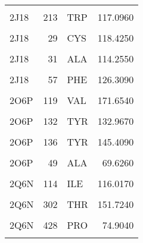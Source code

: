 \begin{table}
\begin{tabular}{lrlr}
			\cellcolor{gray!6}{2J18} & \cellcolor{gray!6}{186} & \cellcolor{gray!6}{PHE} & \cellcolor{gray!6}{174.2510}\\
			2J18 & 213 & TRP & 117.0960\\
			\cellcolor{gray!6}{2J18} & \cellcolor{gray!6}{28} & \cellcolor{gray!6}{PRO} & \cellcolor{gray!6}{75.1381}\\
			2J18 & 29 & CYS & 118.4250\\
			\addlinespace
			\cellcolor{gray!6}{2J18} & \cellcolor{gray!6}{30} & \cellcolor{gray!6}{PRO} & \cellcolor{gray!6}{66.0535}\\
			2J18 & 31 & ALA & 114.2550\\
			\cellcolor{gray!6}{2J18} & \cellcolor{gray!6}{32} & \cellcolor{gray!6}{LEU} & \cellcolor{gray!6}{96.2823}\\
			2J18 & 57 & PHE & 126.3090\\
			\cellcolor{gray!6}{2J18} & \cellcolor{gray!6}{71} & \cellcolor{gray!6}{ALA} & \cellcolor{gray!6}{139.0360}\\
			\addlinespace
			2O6P & 119 & VAL & 171.6540\\
			\cellcolor{gray!6}{2O6P} & \cellcolor{gray!6}{121} & \cellcolor{gray!6}{ILE} & \cellcolor{gray!6}{132.2050}\\
			2O6P & 132 & TYR & 132.9670\\
			\cellcolor{gray!6}{2O6P} & \cellcolor{gray!6}{134} & \cellcolor{gray!6}{HIS} & \cellcolor{gray!6}{146.7790}\\
			2O6P & 136 & TYR & 145.4090\\
			\addlinespace
			\cellcolor{gray!6}{2O6P} & \cellcolor{gray!6}{48} & \cellcolor{gray!6}{ILE} & \cellcolor{gray!6}{141.3220}\\
			2O6P & 49 & ALA & 69.6260\\
			\cellcolor{gray!6}{2O6P} & \cellcolor{gray!6}{52} & \cellcolor{gray!6}{TYR} & \cellcolor{gray!6}{136.9010}\\
			2Q6N & 114 & ILE & 116.0170\\
			\cellcolor{gray!6}{2Q6N} & \cellcolor{gray!6}{298} & \cellcolor{gray!6}{ALA} & \cellcolor{gray!6}{129.8410}\\
			\addlinespace
			2Q6N & 302 & THR & 151.7240\\
			\cellcolor{gray!6}{2Q6N} & \cellcolor{gray!6}{363} & \cellcolor{gray!6}{ILE} & \cellcolor{gray!6}{150.8430}\\
			2Q6N & 428 & PRO & 74.9040\\
			\cellcolor{gray!6}{2Q6N} & \cellcolor{gray!6}{429} & \cellcolor{gray!6}{PHE} & \cellcolor{gray!6}{80.7723}\\

\end{tabular}
\end{table}

